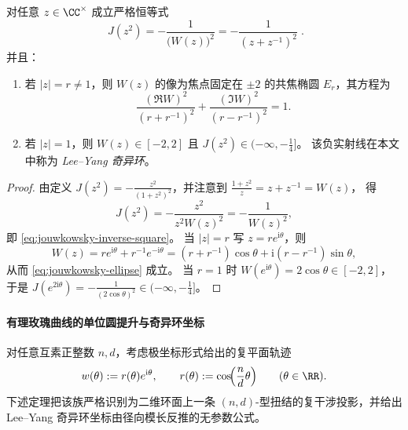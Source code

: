 \begin{proposition}\label{prop:jouwkowsky-inverse-square}
对任意 \(z\in\CC^{\times}\) 成立严格恒等式
\begin{equation}\label{eq:jouwkowsky-inverse-square}
\boxed{\;
J(z^{2})=-\frac{1}{\bigl(W(z)\bigr)^{2}}=-\frac{1}{(z+z^{-1})^{2}}\; }.
\end{equation}
并且：
\begin{enumerate}
  \item 若 \(|z|=r\neq 1\)，则 \(W(z)\) 的像为焦点固定在 \(\pm 2\) 的共焦椭圆 \(E_r\)，其方程为
  \begin{equation}\label{eq:jouwkowsky-ellipse}
  \frac{(\Re W)^2}{(r+r^{-1})^2}+\frac{(\Im W)^2}{(r-r^{-1})^2}=1.
  \end{equation}
  \item 若 \(|z|=1\)，则 \(W(z)\in[-2,2]\) 且 \(J(z^2)\in(-\infty,-\tfrac14]\)。
  该负实射线在本文中称为 \emph{Lee--Yang 奇异环}。
\end{enumerate}
\end{proposition}
\begin{proof}
由定义 \(J(z^2)=-\frac{z^2}{(1+z^2)^2}\)，并注意到
\(
\frac{1+z^2}{z}=z+z^{-1}=W(z)
\)，
得
\[
J(z^2)=-\frac{z^2}{z^2 W(z)^2}=-\frac{1}{W(z)^2},
\]
即 \eqref{eq:jouwkowsky-inverse-square}。
当 \(|z|=r\) 写 \(z=re^{\mathrm{i}\theta}\)，则
\[
W(z)=re^{\mathrm{i}\theta}+r^{-1}e^{-\mathrm{i}\theta}
=(r+r^{-1})\cos\theta+\mathrm{i}(r-r^{-1})\sin\theta,
\]
从而 \eqref{eq:jouwkowsky-ellipse} 成立。
当 \(r=1\) 时 \(W(e^{\mathrm{i}\theta})=2\cos\theta\in[-2,2]\)，于是
\(
J(e^{2\mathrm{i}\theta})=-\frac{1}{(2\cos\theta)^2}\in(-\infty,-\tfrac14]
\)。
\end{proof}






\paragraph{有理玫瑰曲线的单位圆提升与奇异环坐标}
对任意互素正整数 \(n,d\)，考虑极坐标形式给出的复平面轨迹
\begin{equation}\label{eq:leyang-polar-cos-family}
w(\theta):=r(\theta)e^{\mathrm{i}\theta},\qquad
r(\theta):=\cos\!\Bigl(\frac{n}{d}\theta\Bigr)\qquad(\theta\in\RR).
\end{equation}
下述定理把该族严格识别为二维环面上一条 \((n,d)\)-型扭结的复干涉投影，并给出 Lee--Yang 奇异环坐标由径向模长反推的无参数公式。

